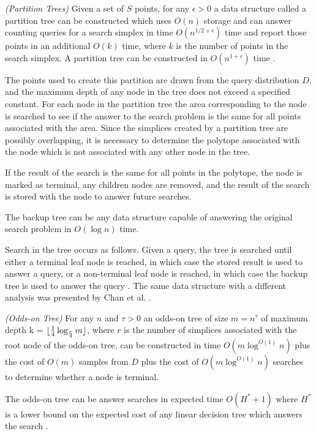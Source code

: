 \documentclass[mcs]{scsthesis}
\begin{document}
\begin{thm} \emph{(Partition Trees)} 
Given a set of \(S\) points, for any \(\epsilon > 0\) a data structure called
a partition tree can be constructed which uses \(O(n)\) storage and can answer
counting queries for a search simplex in time \(O(n^{1/2 + \epsilon})\) time and
report those points in an additional \(O(k)\) time, where \(k\) is the number
of points in the search simplex. A partition tree can be constructed in
\(O(n^{1 + \epsilon})\) time \cite{dutch}.
\end{thm}

The points used to create this partition are drawn from the query distribution
\(D\), and the maximum depth of any node in the tree does not exceed a specified
constant. For each node in the partition tree the area corresponding to the node
is searched to see if the answer to the search problem is the same for all points
associated with the area. Since the simplices created by a partition tree are
possibly overlapping, it is necessary to determine the polytope associated with
the node which is not associated with any other node in the tree.

If the result of the search is the same for all points in the polytope, the node
is marked as terminal, any children nodes are removed, and the result of the
search is stored with the node to answer future searches.

The backup tree can be any data structure capable of answering the original
search problem in \(O(\log n)\) time.

Search in the tree occurs as follows. Given a query, the tree is searched until
either a terminal leaf node is reached, in which case the stored result is used
to answer a query, or a non-terminal leaf node is reached, in which case the
backup tree is used to answer the query \cite{oddson}. The same data structure
with a different analysis was presented by Chan et al. \cite{chan}.

\begin{thm} \emph{(Odds-on Tree)}
For any \(n\) and \(\tau>0\) an odds-on tree of size \(m = n^\tau\) of maximum
depth k = \(\lfloor {1 \over 4} \log_{r \over 3} m \rfloor \), where \(r\) is
the number of simplices associated with the root node of the odds-on tree, can
be constructed in time \(O(m \log^{O(1)} n)\) plus the cost of \(O(m)\) samples
from \(D\) plus the cost of \(O(m \log^{O(1)} n)\) searches to determine whether
a node is terminal.

The odds-on tree can be answer searches in expected time \(O(H^* + 1)\) where
\(H^*\) is a lower bound on the expected cost of any linear decision tree
which answers the search \cite{oddson}.  
\end{thm}
\end{document}
